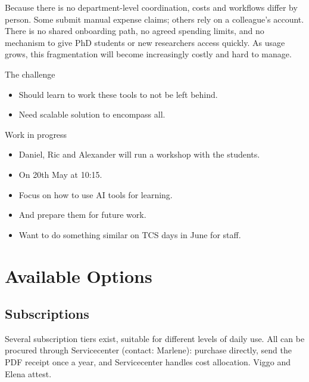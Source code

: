 Because there is no department-level coordination, costs and workflows differ by person.
Some submit manual expense claims; others rely on a colleague's account.
There is no shared onboarding path, no agreed spending limits, and no mechanism to give
PhD students or new researchers access quickly.
As usage grows, this fragmentation will become increasingly costly and hard to manage.

\begin{frame}
  \begin{block}{The challenge}
    \begin{itemize}
      \item Should learn to work these tools to not be left behind.
      \item Need scalable solution to encompass all.
    \end{itemize}
  \end{block}

  \pause

  \begin{block}{Work in progress}
    \begin{itemize}
      \item Daniel, Ric and Alexander will run a workshop with the students.
      \item On 20th May at 10:15.
      \item Focus on how to use AI tools for learning.
      \item And prepare them for future work.
      \item Want to do something similar on TCS days in June for staff.
    \end{itemize}
  \end{block}
\end{frame}


\section{Available Options}

\subsection{Subscriptions}

Several subscription tiers exist, suitable for different levels of daily use.
All can be procured through Servicecenter (contact: Marlene): purchase directly, send the PDF
receipt once a year, and Servicecenter handles cost allocation.
Viggo and Elena attest.

